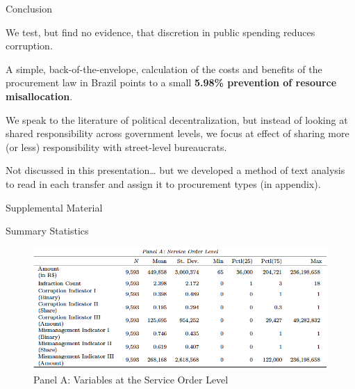 \documentclass[10pt,ignorenonframetext,]{beamer}
\begin{document}
\begin{frame}{Conclusion}
\protect\hypertarget{conclusion}{}

We test, but find no evidence, that discretion in public spending
reduces corruption.

A simple, back-of-the-envelope, calculation of the costs and benefits of
the procurement law in Brazil points to a small \textbf{5.98\%
prevention of resource misallocation}.

We speak to the literature of political decentralization, but instead of
looking at shared responsibility across government levels, we focus at
effect of sharing more (or less) responsibility with street-level
bureaucrats.

Not discussed in this presentation\ldots{} but we developed a method of
text analysis to read in each transfer and assign it to procurement
types (in appendix).

\end{frame}

\begin{frame}{Supplemental Material}
\protect\hypertarget{supplemental-material}{}

\end{frame}

\begin{frame}{Summary Statistics}
\protect\hypertarget{summary-statistics}{}

\begin{figure}
\centering
\includegraphics{./images/panelA.png}
\caption{Panel A: Variables at the Service Order Level}
\end{figure}

\end{frame}
\end{document}
